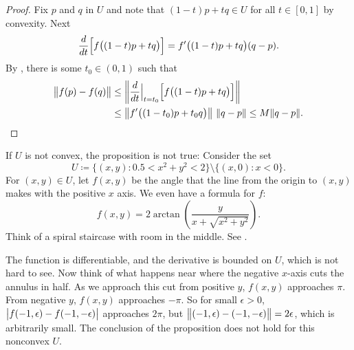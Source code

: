 \begin{proof}
Fix $p$ and $q$ in $U$ and note that
$(1-t)p+tq \in U$ for all $t \in [0,1]$
by convexity.
Next
\begin{equation*}
\frac{d}{dt} \Bigl[f\bigl((1-t)p+tq\bigr)\Bigr]
=
f'\bigl((1-t)p+tq\bigr) (q-p) .
\end{equation*}
By , there is some
$t_0 \in (0,1)$ such that
\begin{equation*}
\begin{split}
\bigl\lVert {f(p)-f(q)} \bigr\rVert & \leq
\left\lVert {\frac{d}{dt} \Big|_{t=t_0} \Bigl[ f\bigl((1-t)p+tq\bigr) \Bigr] } \right\rVert
\\
& \leq
\left\lVert {f'\bigl((1-t_0)p+t_0q\bigr)} \right\rVert \, \lVert {q-p} \rVert \leq
M \lVert {q-p} \rVert . \qedhere
\end{split}
\end{equation*}
\end{proof}

\begin{example}
If $U$ is not convex, the proposition is not true: Consider
the set
\begin{equation*}
U \coloneqq \bigl\{ (x,y) : 0.5 < x^2+y^2 < 2 \bigr\}
\setminus \bigl\{ (x,0) : x < 0 \bigr\} .
\end{equation*}
For $(x,y) \in U$,
let $f(x,y)$ be the angle that the line from the origin to $(x,y)$
makes with the positive $x$ axis.  We even have a formula for $f$:
\begin{equation*}
f(x,y) = 2 \operatorname{arctan}\left( \frac{y}{x+\sqrt{x^2+y^2}}\right) .
\end{equation*}
Think of a spiral staircase with room in the middle.  See
.

\begin{myfigureht}
\caption{A non-Lipschitz function with uniformly bounded
derivative.\label{mv:fignonlip}}
\end{myfigureht}

The function is differentiable,
and the derivative is bounded on $U$, which is not hard to see.   Now
think of
what happens near where the negative $x$-axis cuts the annulus in half.
As we approach this cut from positive $y$, $f(x,y)$ approaches $\pi$.
From negative $y$, $f(x,y)$ approaches $-\pi$.
So for small $\epsilon > 0$, $\bigl\lvert {f(-1,\epsilon)-f(-1,-\epsilon)} \bigr\rvert$
approaches $2\pi$, but $\bigl\lVert {(-1,\epsilon)-(-1,-\epsilon)} \bigr\rVert = 2\epsilon$,
which is arbitrarily small.  The conclusion of the proposition does not
hold for this nonconvex $U$.
\end{example}

